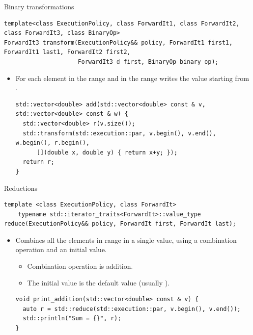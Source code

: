 \begin{frame}[t,fragile]{Binary transformations}
\begin{lstlisting}
template<class ExecutionPolicy, class ForwardIt1, class ForwardIt2, class ForwardIt3, class BinaryOp>
ForwardIt3 transform(ExecutionPolicy&& policy, ForwardIt1 first1, ForwardIt1 last1, ForwardIt2 first2,
                     ForwardIt3 d_first, BinaryOp binary_op);
\end{lstlisting}

\begin{itemize}
  \item For each element  in the range \textgood{[first1, last1)}
        and  in the range \textgood{[first2,\ldots)}
        writes the value  starting from \textgood{[d\_first,\ldots)}.
\begin{lstlisting}
std::vector<double> add(std::vector<double> const & v, std::vector<double> const & w) {
  std::vector<double> r(v.size());
  std::transform(std::execution::par, v.begin(), v.end(), w.begin(), r.begin(), 
      [](double x, double y) { return x+y; });
  return r;
}
\end{lstlisting}
\end{itemize}
\end{frame}

\begin{frame}[t,fragile]{Reductions}
\begin{lstlisting}
template <class ExecutionPolicy, class ForwardIt>
    typename std::iterator_traits<ForwardIt>::value_type
reduce(ExecutionPolicy&& policy, ForwardIt first, ForwardIt last);
\end{lstlisting}

\begin{itemize}
  \item Combines all the elements in range \textgood{[first,last)}
        in a single value, using a combination operation and an initial value.  
    \begin{itemize}
      \item Combination operation is addition.
      \item The initial value is the default value (usually ).
    \end{itemize}
\begin{lstlisting}
void print_addition(std::vector<double> const & v) {
  auto r = std::reduce(std::execution::par, v.begin(), v.end());
  std::println("Sum = {}", r);
}
\end{lstlisting}
\end{itemize}

\end{frame}


